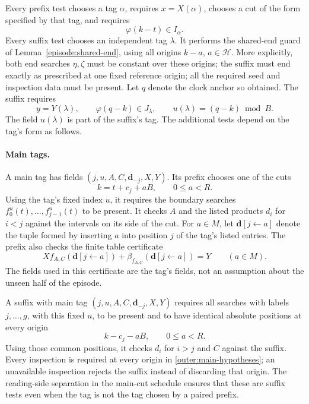 Every prefix test chooses a tag $\alpha$, requires
$x=X(\alpha)$, chooses a cut of the form specified by that tag, and
requires
\begin{equation}
                 \varphi(k-t)\in I_\alpha.
 \label{outer:prefix-clock}
\end{equation}
Every suffix test chooses an independent tag $\lambda$.  It performs
the shared-end guard of Lemma~\ref{episode:shared-end}, using all
origins $k-a$, $a\in\mathcal H$.  More explicitly, both end searches
$\eta,\zeta$ must be constant over these origins; the suffix must
end exactly as prescribed at one fixed reference origin; all the
required seed and inspection data must be present.  Let $q$ denote
the clock anchor so obtained.  The suffix requires
\begin{equation}
 y=Y(\lambda),\qquad
 \varphi(q-k)\in J_\lambda,\qquad
 u(\lambda)=(q-k)\bmod B.
 \label{outer:suffix-clock}
\end{equation}
The field $u(\lambda)$ is part of the suffix's tag.  The additional
tests depend on the tag's form as follows.

\paragraph{Main tags.}
A main tag has fields $(j,u,A,C,\mathbf d_{-j},X,Y)$.
Its prefix chooses one of the cuts
\[
                 k=t+c_j+aB,\qquad 0\le a<R.
\]
Using the tag's fixed index $u$, it requires the boundary searches
$f_0^u(t),\ldots,f_{j-1}^u(t)$ to be present.  It checks $A$ and
the listed products $d_i$ for $i<j$ against the intervals on its
side of the cut.  For $a\in M$, let $\mathbf d[j\leftarrow a]$
denote the tuple formed by inserting $a$ into position $j$ of the
tag's listed entries.  The prefix also checks the finite table certificate
\begin{equation}
 X f_{A,C}(\mathbf d[j\leftarrow a])
 +\beta_{f_{A,C}}(\mathbf d[j\leftarrow a])=Y
 \qquad(a\in M).
 \label{outer:main-certificate}
\end{equation}
The fields used in this certificate are the tag's fields, not an
assumption about the unseen half of the episode.

A suffix with main tag $(j,u,A,C,\mathbf d_{-j},X,Y)$ requires all
searches with labels $j,\ldots,g$, with this fixed $u$, to be present
and to have identical absolute positions at every origin
\begin{equation}
                  k-c_j-aB,\qquad 0\le a<R.
 \label{outer:main-hypotheses}
\end{equation}
Using those common positions, it checks $d_i$ for $i>j$ and $C$
against the suffix.  Every inspection is required at every origin
in \eqref{outer:main-hypotheses}; an unavailable inspection rejects
the suffix instead of discarding that origin.  The reading-side
separation in the main-cut schedule ensures that these are suffix
tests even when the tag is not the tag chosen by a paired prefix.

